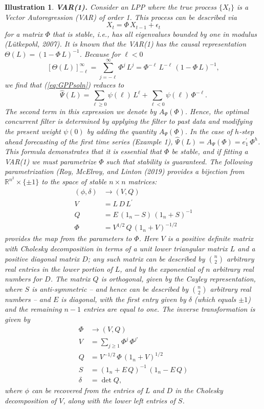 \documentclass[a4paper]{book}
\def\RR{\mathbb R}
\def\tends{\rightarrow}
\newtheorem{Illustration}{Illustration}
\begin{document}
\begin{Illustration} {\bf  VAR(1).} \rm
\label{ill:var1}
 Consider an LPP where the true process $\{ X_t \}$
 is a Vector Autoregression (VAR) of order 1.  This process can be described via
\[
  X_t = \Phi \, X_{t-1} + \epsilon_t
\]
 for a matrix $\Phi$ that is stable, i.e., has 
 all eigenvalues bounded by one in modulus (L\"utkepohl, 2007). 
It is known that the VAR(1) has the causal representation  
 $\Theta (L) = {(1 - \Phi \, L )}^{-1}$.  Because
 for $\ell < 0$ 
\[
   { [ \Theta (L) ]}_{-\ell}^{ \infty  } = \sum_{j = -\ell}^{\infty} \Phi^j \, L^j 
  = \Phi^{-\ell} \, L^{-\ell} \, {( 1 - \Phi \, L )}^{-1},
\]
 we find that (\ref{eq:GPPsoln}) reduces to
\[
  \widehat{\Psi} (L) =   \sum_{\ell \geq 0 } \psi (\ell) \, L^{\ell} +
	\sum_{\ell < 0} \psi (\ell) \, \Phi^{-\ell}.
\]
  The second term in this expression we denote by $A_{\Psi} (\Phi)$.  Hence, the optimal
 concurrent filter is determined by applying the filter to past data and modifying the
 present weight $\psi (0)$ by adding the quantity $A_{\Psi} (\Phi)$.  In the case of
 $h$-step ahead forecasting of the first time series (Example 1), $\widehat{\Psi} (L)
 = A_{\Psi} (\Phi) = e_1^{\prime} \, \Phi^h$.  This formula demonstrates that it is 
 essential that $\Phi$ be stable, and if fitting a VAR(1) we must parametrize $\Phi$
 such that stability is guaranteed.  The following parametrization 
 (Roy, McElroy, and Linton (2019) provides a bijection from $\RR^{n^2} \times \{ \pm 1 \}$
 to the space of stable $n \times n $ matrices:
\begin{align*}
  (\phi, \delta) & \tends (V, Q) \\
 	V & = L \, D \, L^{\prime} \\
	Q & = E \, ( 1_n - S ) \, {(1_n + S )}^{-1} \\
 	\Phi & = V^{1/2} \, Q \, {(1_n + V )}^{-1/2}
\end{align*}
 provides the map from the parameters to $\Phi$.  Here $V$ is  a positive definite 
 matrix with Cholesky decomposition in terms of a unit lower triangular matrix $L$ and
 a positive diagonal matrix $D$; any such matrix can be described by $\binom{n}{2}$
 arbitrary real entries in the lower portion of $L$, and by the exponential of $n$ arbitrary
 real numbers for $D$.  The matrix $Q$ is orthogonal, given by the Cayley representation,
 where $S$ is anti-symmetric -- and hence can be described by $\binom{n}{2}$ arbitrary
 real numbers -- and $E$ is diagonal, with the first entry given by $\delta $ (which equals
 $\pm 1$) and the remaining $n-1$ entries are equal to one.  The inverse transformation is 
 given by
\begin{align*}
   \Phi & \tends (V, Q) \\
	V & = \sum_{j \geq 1} \Phi^j \, \Phi^{j \prime} \\
	Q & = V^{-1/2} \, \Phi \, {(1_n + V )}^{1/2} \\
	S & = {(1_n + E \, Q)}^{-1} \, (1_n - E \, Q) \\
	\delta & = \det Q,
\end{align*}
 where $\phi$ can be recovered from the entries of $L$ and $D$ in the Cholesky decomposition
 of $V$, along with the lower left entries of $S$.
\end{Illustration}
\end{document}
